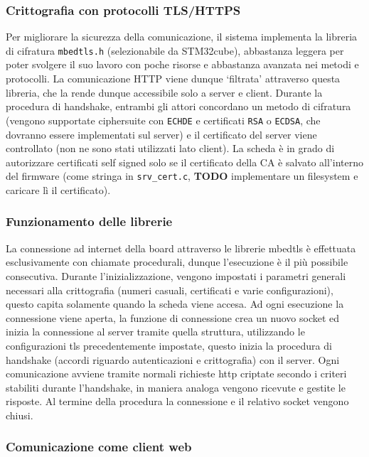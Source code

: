 \subsubsection{Crittografia con protocolli TLS/HTTPS}

Per migliorare la sicurezza della comunicazione, il sistema implementa la libreria di cifratura \texttt{mbedtls.h} (selezionabile da STM32cube), abbastanza leggera per poter svolgere il suo lavoro con poche risorse e abbastanza avanzata nei metodi e protocolli. La comunicazione HTTP viene dunque `filtrata' attraverso questa libreria, che la rende dunque accessibile solo a server e client. Durante la procedura di handshake, entrambi gli attori concordano un metodo di cifratura (vengono supportate ciphersuite con \texttt{ECHDE} e certificati \texttt{RSA} o \texttt{ECDSA}, che dovranno essere implementati sul server) e il certificato del server viene controllato (non ne sono stati utilizzati lato client). La scheda \`e in grado di autorizzare certificati self signed solo se il certificato della CA \`e salvato all'interno del firmware (come stringa in \texttt{srv\_cert.c}, \textbf{TODO} implementare un filesystem e caricare l\`i il certificato).

\subsubsection{Funzionamento delle librerie}

La connessione ad internet della board attraverso le librerie mbedtls \`e effettuata esclusivamente con chiamate procedurali, dunque l'esecuzione \`e il pi\`u possibile consecutiva. Durante l'inizializzazione, vengono impostati i parametri generali necessari alla crittografia (numeri casuali, certificati e varie configurazioni), questo capita solamente quando la scheda viene accesa. Ad ogni esecuzione la connessione viene aperta, la funzione di connessione crea un nuovo socket ed inizia la connessione al server tramite quella struttura, utilizzando le configurazioni tls precedentemente impostate, questo inizia la procedura di handshake (accordi riguardo autenticazioni e crittografia) con il server. Ogni comunicazione avviene tramite normali richieste http criptate secondo i criteri stabiliti durante l'handshake, in maniera analoga vengono ricevute e gestite le risposte. Al termine della procedura la connessione e il relativo socket vengono chiusi.

\subsubsection{Comunicazione come client web}

